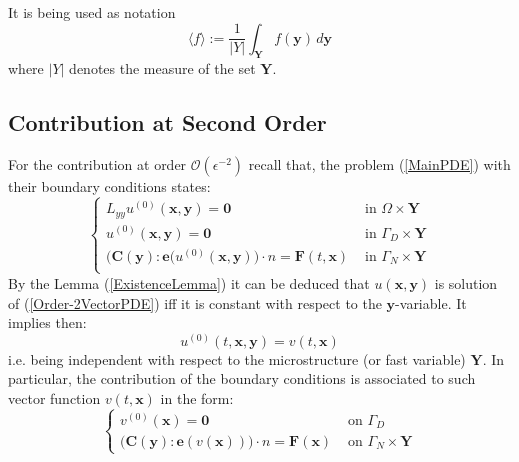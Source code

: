 \begin{rem}
It is being used as notation
\begin{equation*}
    \langle f \rangle := \frac{1}{\vert Y \vert} \int_{\mathbf{Y}} f(\mathbf{y}) \, d\mathbf{y}
\end{equation*}
where $\vert Y \vert$ denotes the measure of the set $\mathbf{Y}$.
\end{rem}

\subsection{Contribution at Second Order}
For the contribution at order $\mathcal{O}(\epsilon^{-2})$ recall that, the problem (\ref{MainPDE}) with their boundary conditions states:
\begin{equation}
    \label{Order-2VectorPDE}
    \left \{
    \begin{array}{cc}
        L_{yy} u^{(0)}( \mathbf{x},\mathbf{y}) = \mathbf{0} & \text{ in } \Omega \times \mathbf{Y}\\
        u^{(0)} (\mathbf{x},\mathbf{y}) = \mathbf{0} & \text{ in } \Gamma_D \times \mathbf{Y} \\
        \big( \mathbf{C}(\mathbf{y}) :\mathbf{e}(u^{(0)}(\mathbf{x},\mathbf{y}) \big) \cdot n = \mathbf{F}(t, \mathbf{x}) & \text{ in } \Gamma_N \times \mathbf{Y} \\
    \end{array}
    \right .
\end{equation}
By the Lemma (\ref{ExistenceLemma}) it can be deduced that $u(\mathbf{x},\mathbf{y})$ is solution of (\ref{Order-2VectorPDE}) iff it is constant with respect to the $\mathbf{y}$-variable. It implies then:
\begin{equation}
    \label{IndepencyofY}
    u^{(0)}(t, \mathbf{x},\mathbf{y}) = v(t, \mathbf{x})
\end{equation}
i.e. being independent with respect to the microstructure (or fast variable) $\mathbf{Y}$. In particular, the contribution of the boundary conditions is associated to such vector function $v(t, \mathbf{x})$ in the form:
\begin{equation*}
    \left \{
    \begin{array}{cc}
        v^{(0)}(\mathbf{x}) = \mathbf{0} & \text{ on } \Gamma_D\\
        \big(\mathbf{C}(\mathbf{y}):\mathbf{e}(v(\mathbf{x})) \big) \cdot n = \mathbf{F}(\mathbf{x}) & \text{ on } \Gamma_N \times \mathbf{Y}
    \end{array}
    \right .
\end{equation*}

